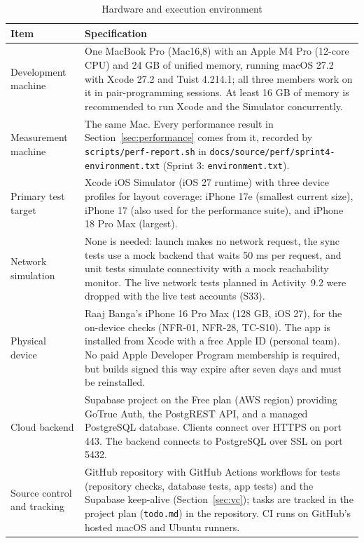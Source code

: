 \documentclass[12pt,letterpaper]{article}
\begin{document}
\begin{table}[H]
\centering
\caption{Hardware and execution environment}
\label{tab:hardware}
\begin{tabularx}{\textwidth}{@{}L{3.3cm} Y@{}}
\toprule
\textbf{Item} & \textbf{Specification} \\
\midrule
Development machine & One MacBook Pro (Mac16,8) with an Apple M4 Pro (12-core CPU) and 24 GB of unified memory, running macOS 27.2 with Xcode 27.2 and Tuist 4.214.1; all three members work on it in pair-programming sessions. At least 16 GB of memory is recommended to run Xcode and the Simulator concurrently. \\
Measurement machine & The same Mac. Every performance result in Section~\ref{sec:performance} comes from it, recorded by \texttt{scripts/perf-report.sh} in \texttt{docs/source/perf/sprint4-environment.txt} (Sprint 3: \texttt{environment.txt}). \\
Primary test target & Xcode iOS Simulator (iOS 27 runtime) with three device profiles for layout coverage: iPhone 17e (smallest current size), iPhone 17 (also used for the performance suite), and iPhone 18 Pro Max (largest). \\
Network simulation & None is needed: launch makes no network request, the sync tests use a mock backend that waits 50 ms per request, and unit tests simulate connectivity with a mock reachability monitor. The live network tests planned in Activity~9.2 were dropped with the live test accounts (S33). \\
Physical device & Raaj Banga's iPhone 16 Pro Max (128 GB, iOS 27), for the on-device checks (NFR-01, NFR-28, TC-S10). The app is installed from Xcode with a free Apple ID (personal team). No paid Apple Developer Program membership is required, but builds signed this way expire after seven days and must be reinstalled. \\
Cloud backend & Supabase project on the Free plan (AWS region) providing GoTrue Auth, the PostgREST API, and a managed PostgreSQL database. Clients connect over HTTPS on port 443. The backend connects to PostgreSQL over SSL on port 5432. \\
Source control and tracking & GitHub repository with GitHub Actions workflows for tests (repository checks, database tests, app tests) and the Supabase keep-alive (Section~\ref{sec:vc}); tasks are tracked in the project plan (\texttt{todo.md}) in the repository. CI runs on GitHub's hosted macOS and Ubuntu runners. \\
\bottomrule
\end{tabularx}
\end{table}
\end{document}
